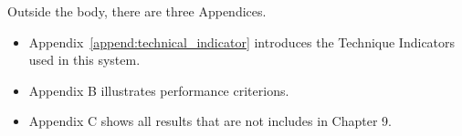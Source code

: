 Outside the body, there are three Appendices.
\begin{itemize}
	\item Appendix~\ref{append:technical_indicator} introduces the Technique Indicators used in this system.
	\item Appendix B illustrates performance criterions.
	\item Appendix C shows all results that are not includes in Chapter 9.
\end{itemize}



